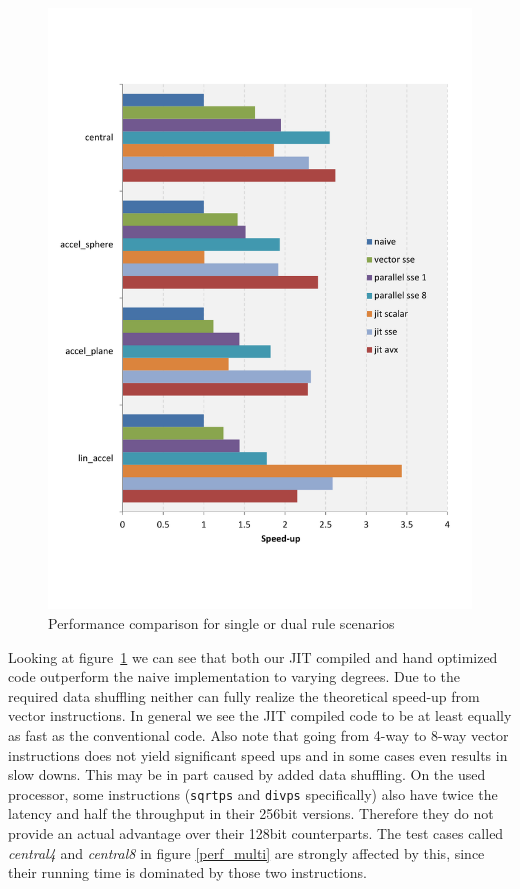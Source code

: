 \begin{figure}[th]\centering
  \includegraphics[scale=0.6]{single_dual_rules.pdf}
  \caption{Performance comparison for single or dual rule scenarios
  \label{perf_single}}
\end{figure}

Looking at figure~\ref{perf_single} we can see that both our JIT compiled and hand optimized code outperform the naive implementation to varying degrees. Due to the required data shuffling neither can fully realize the theoretical speed-up from vector instructions. In general we see the JIT compiled code to be at least equally as fast as the conventional code. Also note that going from 4-way to 8-way vector instructions does not yield significant speed ups and in some cases even results in slow downs. This may be in part caused by added data shuffling. On the used processor, some instructions (\texttt{sqrtps} and \texttt{divps} specifically) also have twice the latency and half the throughput in their 256bit versions. Therefore they do not provide an actual advantage over their 128bit counterparts. The test cases called \emph{central4} and \emph{central8} in figure \ref{perf_multi} are strongly affected by this, since their running time is dominated by those two instructions.

